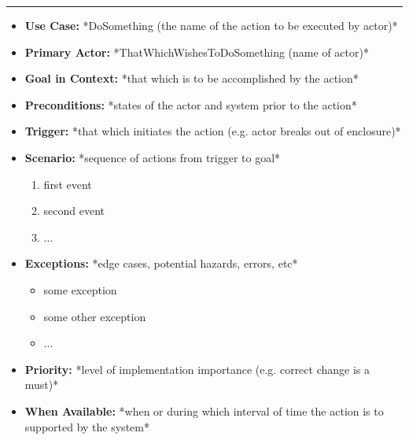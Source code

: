 \documentclass[12pt]{article}
\begin{document}
    \par\noindent\rule{\textwidth}{0.4pt}    
    \begin{itemize} %
        \item[]\textbf{Use Case:}                                
            *DoSomething (the name of the action to be executed by actor)*

        \item[]\textbf{Primary Actor:}
            *ThatWhichWishesToDoSomething (name of actor)*

        \item[]\textbf{Goal in Context:}
            *that which is to be accomplished by the action*

        \item[]\textbf{Preconditions:}
            *states of the actor and system prior to the action*

        \item[]\textbf{Trigger:}
            *that which initiates the action (e.g. actor breaks out of enclosure)*

        \item[]\textbf{Scenario:}
            *sequence of actions from trigger to goal*
            \begin{enumerate}
                \item first event
                \item second event
                \item ...
            \end{enumerate}

        \item[]\textbf{Exceptions:}
            *edge cases, potential hazards, errors, etc*
            \begin{itemize}
                \item[] some exception
                \item[] some other exception                
                \item[] ...
            \end{itemize}

        \item[]\textbf{Priority:}
            *level of implementation importance (e.g. correct change is a must)*

        \item[]\textbf{When Available:}
            *when or during which interval of time the action is to supported by the system*


\end{itemize}
\end{document}
